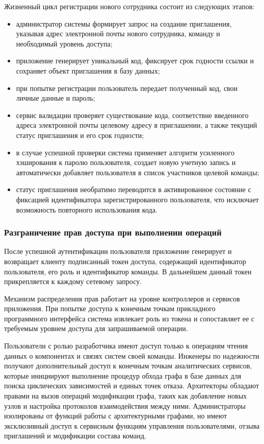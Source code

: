 Жизненный цикл регистрации нового сотрудника состоит из следующих этапов:
\begin{itemize}
    \item администратор системы формирует запрос на создание приглашения, 
    указывая адрес электронной почты нового сотрудника, команду и необходимый 
    уровень доступа;
    \item приложение генерирует уникальный код, 
    фиксирует срок годности ссылки и сохраняет объект приглашения в базу данных;
    \item при попытке регистрации пользователь передает полученный код, свои 
    личные данные и пароль;
    \item сервис валидации проверяет существование кода, соответствие введенного 
    адреса электронной почты целевому адресу в приглашении, а также текущий 
    статус приглашения и его срок годности;
    \item в случае успешной проверки система применяет алгоритм усиленного 
    хэширования к паролю пользователя, создает новую учетную запись и автоматически 
    добавляет пользователя в список участников целевой команды;
    \item статус приглашения необратимо переводится в активированное состояние с 
    фиксацией идентификатора зарегистрированного пользователя, что исключает 
    возможность повторного использования кода.
\end{itemize}

\subsubsection{Разграничение прав доступа при выполнении операций}

После успешной аутентификации пользователя приложение генерирует и возвращает 
клиенту подписанный токен доступа, содержащий идентификатор пользователя, его 
роль и идентификатор команды. В дальнейшем данный токен прикрепляется к каждому 
сетевому запросу.

Механизм распределения прав работает на уровне контроллеров и сервисов приложения. 
При попытке доступа к конечным точкам прикладного программного интерфейса система 
извлекает роль из токена и сопоставляет ее с требуемым уровнем доступа для 
запрашиваемой операции.

Пользователи с ролью разработчика имеют доступ только к операциям чтения данных 
о компонентах и связях систем своей команды. Инженеры по надежности получают 
дополнительный доступ к конечным точкам аналитических сервисов, которые инициируют 
выполнение процедур обхода графа в базе данных для поиска циклических зависимостей 
и единых точек отказа. Архитекторы обладают правами на вызов операций модификации 
графа, таких как добавление новых узлов и настройка протоколов взаимодействия между 
ними. Администраторы изолированы от функций работы с архитектурными графами, но 
имеют эксклюзивный доступ к сервисным функциям управления пользователями, отзыва 
приглашений и модификации состава команд.

